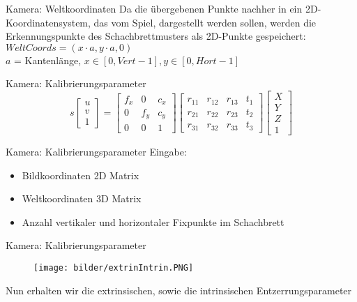 \begin{frame}{Kamera: Weltkoordinaten}
	Da die übergebenen Punkte nachher in ein 2D-Koordinatensystem, das vom Spiel, dargestellt werden sollen, werden die Erkennungspunkte des Schachbrettmusters als 2D-Punkte gespeichert:\\
	$WeltCoords = (x \cdot a, y \cdot a, 0)$\\
	$a$ = Kantenlänge, $x \in [0,Vert-1], y \in [0,Hort-1]$\\
\end{frame}

\begin{frame}{Kamera: Kalibrierungsparameter}
	\[s
	\begin{bmatrix}
	u\\v\\1
	\end{bmatrix}=
	\begin{bmatrix}
	f_{x} & 0 & c_{x}\\
	0 & f_{y} & c_{y}\\
	0 & 0 & 1
	\end{bmatrix}
	\begin{bmatrix}
	r_{11} & r_{12} & r_{13} & t_{1} \\
	r_{21} & r_{22} & r_{23} & t_{2} \\
	r_{31} & r_{32} & r_{33} & t_{3}
	\end{bmatrix}
	\begin{bmatrix}
	X\\Y\\Z\\1
	\end{bmatrix}
	\]
\end{frame}

\begin{frame}{Kamera: Kalibrierungsparameter}
	Eingabe:\\
	\begin{itemize}
		\item Bildkoordinaten 2D Matrix\\
		\item Weltkoordinaten 3D Matrix\\
		\item Anzahl vertikaler und horizontaler Fixpunkte im Schachbrett
	\end{itemize}
\end{frame}

\begin{frame}{Kamera: Kalibrierungsparameter}
	\begin{figure}[h]
		\centering
		\texttt{[image: bilder/extrinIntrin.PNG]}
	\end{figure}
	Nun erhalten wir die extrinsischen, sowie die intrinsischen Entzerrungsparameter
\end{frame}

